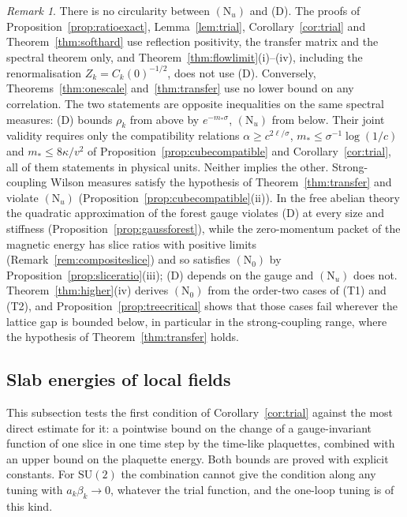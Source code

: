 \documentclass[aps,prd,twocolumn,superscriptaddress,nofootinbib,longbibliography,floatfix,amsmath,amssymb,10pt]{revtex4-2}
\theoremstyle{definition}
\theoremstyle{remark}
\newtheorem{remark}[theorem]{Remark}
\newcommand{\SU}{\mathrm{SU}}
\begin{document}
\begin{remark}\label{rem:independence}
There is no circularity between $(\mathrm N_u)$ and (D). The proofs of
Proposition~\ref{prop:ratioexact}, Lemma~\ref{lem:trial},
Corollary~\ref{cor:trial} and Theorem~\ref{thm:softhard} use reflection
positivity, the transfer matrix and the spectral theorem only, and
Theorem~\ref{thm:flowlimit}(i)--(iv), including the renormalisation
$Z_k=C_k(0)^{-1/2}$, does not use (D). Conversely, Theorems~\ref{thm:onescale}
and~\ref{thm:transfer} use no lower bound on any correlation. The two
statements are opposite inequalities on the same spectral measures: (D)
bounds $\rho_k$ from above by $e^{-m_*\sigma}$, $(\mathrm N_u)$ from below.
Their joint validity requires only the compatibility relations
$\alpha\ge c^{2\ell/\sigma}$, $m_*\le\sigma^{-1}\log(1/c)$ and
$m_*\le8\kappa/v^2$ of Proposition~\ref{prop:cubecompatible} and
Corollary~\ref{cor:trial}, all of them statements in physical units. Neither
implies the other. Strong-coupling Wilson measures satisfy the hypothesis of
Theorem~\ref{thm:transfer} and violate $(\mathrm N_u)$
(Proposition~\ref{prop:cubecompatible}(ii)). In the free abelian theory the
quadratic approximation of the forest gauge violates (D) at every size and
stiffness (Proposition~\ref{prop:gaussforest}), while the zero-momentum packet
of the magnetic energy has slice ratios with positive limits
(Remark~\ref{rem:compositeslice}) and so satisfies $(\mathrm N_0)$ by
Proposition~\ref{prop:sliceratio}(iii); (D) depends on the gauge and
$(\mathrm N_u)$ does not. Theorem~\ref{thm:higher}(iv) derives $(\mathrm N_0)$
from the order-two cases of (T1) and (T2), and
Proposition~\ref{prop:treecritical} shows that those cases fail wherever the
lattice gap is bounded below, in particular in the strong-coupling range,
where the hypothesis of Theorem~\ref{thm:transfer} holds.
\end{remark}

\subsection{Slab energies of local fields}\label{ssec:slabenergy}

This subsection tests the first condition of Corollary~\ref{cor:trial}
against the most direct estimate for it: a pointwise bound on the change of a
gauge-invariant function of one slice in one time step by the time-like
plaquettes, combined with an upper bound on the plaquette energy. Both bounds
are proved with explicit constants. For $\SU(2)$ the combination cannot give the
condition along any tuning with $a_k\beta_k\to0$, whatever the trial
function, and the one-loop tuning is of this kind.
\end{document}

